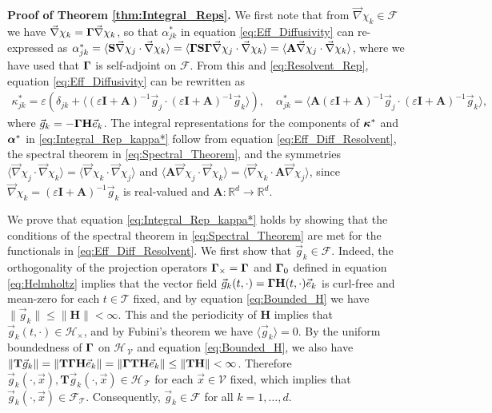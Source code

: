\documentclass[11pt]{amsart}
\newcommand{\Tb}{\mathbf{T}}
\newcommand{\Hb}{\mathbf{H}}
\newcommand{\Ib}{\mathbf{I}}
\newcommand{\Sb}{\mathbf{S}}
\newcommand{\Ab}{\mathbf{A}}
\newcommand{\Tc}{\mathcal{T}}
\newcommand{\Vc}{\mathcal{V}}
\newcommand{\Hs}{\mathscr{H}}
\newcommand{\Fs}{\mathscr{F}}
\newcommand\balpha{\mbox{\boldmath${\alpha}$}}
\newcommand\bkappa{\mbox{\boldmath${\kappa}$}}
\newcommand\bGamma{\mbox{\boldmath${\Gamma}$}}
\begin{document}
\textbf{Proof of Theorem \ref{thm:Integral_Reps}.}\hspace{1ex}
%
We first note that from $\vec{\nabla}\chi_k\in\Fs$ we have 
$\vec{\nabla}\chi_k=\bGamma\vec{\nabla}\chi_k$, so that $\alpha^*_{jk}$ in equation
\eqref{eq:Eff_Diffusivity} can re-expressed as
$\alpha^*_{jk}=\langle\Sb\vec{\nabla}\chi_j\cdot\vec{\nabla}\chi_k\rangle=\langle\bGamma\Sb\bGamma\vec{\nabla}\chi_j\cdot\vec{\nabla}\chi_k\rangle  
=\langle\Ab\vec{\nabla}\chi_j\cdot\vec{\nabla}\chi_k\rangle$, where we have used that $\bGamma$ is
self-adjoint on $\Fs$. From this and \eqref{eq:Resolvent_Rep},
equation \eqref{eq:Eff_Diffusivity} can be rewritten as
%
\begin{align}\label{eq:Eff_Diff_Resolvent}
 \kappa^*_{jk}=\varepsilon(\delta_{jk}+\langle(\varepsilon\Ib+\Ab)^{-1}\vec{g}_j\cdot(\varepsilon\Ib+\Ab)^{-1}\vec{g}_k\rangle), \quad
 \alpha^*_{jk}=\langle\Ab(\varepsilon\Ib+\Ab)^{-1}\vec{g}_j\cdot(\varepsilon\Ib+\Ab)^{-1}\vec{g}_k\rangle,
\end{align}
%
where $\vec{g}_k=-\bGamma\Hb\vec{e}_k$. The integral representations
for the components of $\bkappa^*$ and $\balpha^*$ in
\eqref{eq:Integral_Rep_kappa*} follow from equation
\eqref{eq:Eff_Diff_Resolvent}, the spectral theorem in
\eqref{eq:Spectral_Theorem}, and the symmetries
$\langle\vec{\nabla}\chi_j\cdot\vec{\nabla}\chi_k\rangle=\langle\vec{\nabla}\chi_k\cdot\vec{\nabla}\chi_j\rangle$ and
$\langle\Ab\vec{\nabla}\chi_j\cdot\vec{\nabla}\chi_k\rangle=\langle\vec{\nabla}\chi_k\cdot\Ab\vec{\nabla}\chi_j\rangle$, since
$\vec{\nabla}\chi_k=(\varepsilon\Ib+\Ab)^{-1}\vec{g}_k$ is real-valued and
$\Ab:\mathbb{R}^d\to\mathbb{R}^d$.   




We prove that equation \eqref{eq:Integral_Rep_kappa*} holds by showing
that the conditions of the spectral theorem in
\eqref{eq:Spectral_Theorem} are met for the functionals in
\eqref{eq:Eff_Diff_Resolvent}. We first show 
that $\vec{g}_k\in\Fs$. Indeed, the orthogonality of the projection
operators $\bGamma_\times=\bGamma$ and $\bGamma_0$ defined in equation
\eqref{eq:Helmholtz} implies that the vector field
$\vec{g}_k(t,\cdot)=\bGamma\Hb(t,\cdot)\vec{e}_k$ is curl-free and 
mean-zero for each $t\in\Tc$ fixed, and by equation \eqref{eq:Bounded_H}
we have $\|\vec{g}_k\|\leq\|\Hb\|<\infty$. This and the periodicity of $\Hb$ implies
that $\vec{g}_k(t,\cdot)\in\Hs_\times$, and by Fubini's theorem \cite{Folland:99}
we have $\langle\vec{g}_k\rangle=0$.  By the uniform boundedness of $\bGamma$ on
$\Hs_{\,\Vc}$ and equation \eqref{eq:Bounded_H}, we also have
\cite{Folland:99}
$\|\Tb\vec{g}_k\|=\|\Tb\bGamma\Hb\vec{e}_k\|=\|\bGamma\Tb\Hb\vec{e}_k\|\leq\|\Tb\Hb\|<\infty$.   
Therefore $\vec{g}_k(\cdot,\vec{x}),\Tb\vec{g}_k(\cdot,\vec{x})\in\Hs_{\,\Tc}$ for each
$\vec{x}\in\Vc$ fixed, which implies that
$\vec{g}_k(\cdot,\vec{x})\in\Fs_{\Tc}$. Consequently,  $\vec{g}_k\in\Fs$ for
all $k=1,\ldots,d$.
\end{document}
